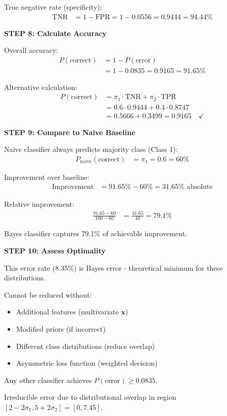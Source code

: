 \documentclass[12pt]{article}
\begin{document}
\begin{solution}
True negative rate (specificity):
\begin{align*}
\text{TNR} &= 1 - \text{FPR} = 1 - 0.0556 = 0.9444 = 94.44\%
\end{align*}

\textbf{STEP 8: Calculate Accuracy}

Overall accuracy:
\begin{align*}
P(\text{correct}) &= 1 - P(\text{error}) \\
&= 1 - 0.0835 = 0.9165 = 91.65\%
\end{align*}

Alternative calculation:
\begin{align*}
P(\text{correct}) &= \pi_1 \cdot \text{TNR} + \pi_2 \cdot \text{TPR} \\
&= 0.6 \cdot 0.9444 + 0.4 \cdot 0.8747 \\
&= 0.5666 + 0.3499 = 0.9165 \quad \checkmark
\end{align*}

\textbf{STEP 9: Compare to Naive Baseline}

Naive classifier always predicts majority class (Class 1):
\begin{align*}
P_{\text{naive}}(\text{correct}) &= \pi_1 = 0.6 = 60\%
\end{align*}

Improvement over baseline:
\begin{align*}
\text{Improvement} &= 91.65\% - 60\% = 31.65\% \text{ absolute}
\end{align*}

Relative improvement:
\begin{align*}
\frac{91.65 - 60}{100 - 60} &= \frac{31.65}{40} = 79.1\%
\end{align*}

Bayes classifier captures 79.1\% of achievable improvement.

\textbf{STEP 10: Assess Optimality}

This error rate (8.35\%) is Bayes error - theoretical minimum for these distributions.

Cannot be reduced without:
\begin{itemize}
\item Additional features (multivariate $\mathbf{x}$)
\item Modified priors (if incorrect)
\item Different class distributions (reduce overlap)
\item Asymmetric loss function (weighted decision)
\end{itemize}

Any other classifier achieves $P(\text{error}) \geq 0.0835$.

Irreducible error due to distributional overlap in region $[2-2\sigma_1, 5+2\sigma_2] = [0, 7.45]$.

\end{solution}
\end{document}
